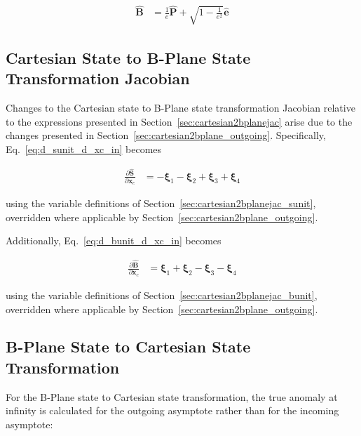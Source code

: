 \documentclass[]{article}
\newcommand{\vb}[1]{\bm{#1}} %
\newcommand{\vbh}[1]{\hat{\bm{#1}}} %
\newcommand{\pd}[2]{\frac{\partial #1}{\partial #2}} %
\newcommand{\xc}[0]{\vb{x}_c}
\begin{document}
\begin{align}
	\vbh{B} &= \frac{1}{e} \vbh{P} + \sqrt{1 - \frac{1}{e^2}} \vbh{e}
\end{align}

\subsection{Cartesian State to B-Plane State Transformation Jacobian}
\label{sec:cartesian2bplanejac_outgoing}

Changes to the Cartesian state to B-Plane state transformation Jacobian relative to the expressions presented in Section~\ref{sec:cartesian2bplanejac} arise due to the changes presented in Section~\ref{sec:cartesian2bplane_outgoing}. Specifically, Eq.~\eqref{eq:d_sunit_d_xc_in} becomes

\begin{align}
	\pd{\vbh{S}}{\xc} &= -\vb{\xi}_1 - \vb{\xi}_2 + \vb{\xi}_3 + \vb{\xi}_4
\end{align}

\noindent using the variable definitions of Section~\ref{sec:cartesian2bplanejac_sunit}, overridden where applicable by Section~\ref{sec:cartesian2bplane_outgoing}.

Additionally, Eq.~\eqref{eq:d_bunit_d_xc_in} becomes

\begin{align}
	\pd{\vbh{B}}{\xc} &= \vb{\xi}_1 + \vb{\xi}_2 - \vb{\xi}_3 - \vb{\xi}_4
\end{align}

\noindent using the variable definitions of Section~\ref{sec:cartesian2bplanejac_bunit}, overridden where applicable by Section~\ref{sec:cartesian2bplane_outgoing}.

\subsection{B-Plane State to Cartesian State Transformation}
\label{sec:bplane2cartesian_outgoing}

For the B-Plane state to Cartesian state transformation, the true anomaly at infinity is calculated for the outgoing asymptote rather than for the incoming asymptote:
\end{document}
